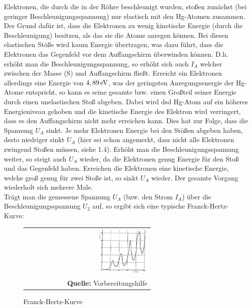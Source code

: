 \documentclass[a4paper,titlepage]{scrartcl}
\numberwithin{equation}{section}
\begin{document}
Elektronen, die durch die in der Röhre beschleunigt wurden, stoßen zunächst (bei geringer Beschleunigungsspannung) nur elastisch mit den Hg-Atomen zusammen. Der Grund dafür ist, dass die Elektronen zu wenig kinetische Energie (durch die Beschleunigung) besitzen, als das sie die Atome anregen können. Bei diesen elastischen Stöße wird kaum Energie übertragen, was dazu führt, dass die Elektronen das Gegenfeld vor dem Auffangschirm überwinden können. D.h. erhöht man die Beschleunigungsspannung, so erhöht sich auch $I_A$ welcher zwischen der Masse (S) und Auffangschirm fließt. Erreicht ein Elektronen allerdings eine Energie von $\unit[4,89]{eV}$, was der geringsten Anregungsenergie der Hg-Atome entspricht, so kann es seine gesamte bzw. einen Großteil seiner Energie durch einen unelastischen Stoß abgeben. Dabei wird dsd Hg-Atom auf ein höheres Energieniveau gehoben und die kinetische Energie des Elektron wird verringert, dass es den Auffangschirm nicht mehr erreichen kann. Dies hat zur Folge, dass die Spannung $U_A$ sinkt. Je mehr Elektronen Energie bei den Stößen abgeben haben, desto niedriger sinkt $U_A$ (hier sei schon angemerkt, dass nicht alle Elektronen zwingend Stoßen müssen, siehe 1.4). Erhöht man die Beschleunigungsspannung weiter, so steigt auch $U_A$ wieder, da die Elektronen genug Energie für den Stoß und das Gegenfeld haben. Erreichen die Elektronen eine kinetische Energie, welche groß genug für zwei Stoße ist, so sinkt $U_A$ wieder. Der gesamte Vorgang wiederholt sich mehrere Male.\\
Trägt man die gemessene Spannung $U_A$ (bzw. den Strom $I_A$) über die Beschleunigungsspannung $U_2$ auf, so ergibt sich eine typische Franck-Hertz-Kurve:

\begin{figure}[H]
	\centering
	\begin{tabular}{@{}r@{}}
		\includegraphics[width=0.4\textwidth]{bilder/franck_hertz_kurve.jpg}\\
		\footnotesize\sffamily\textbf{Quelle:} Vorbereitungshilfe \cite{vorbereitungshilfe}
	\end{tabular}
    \label{fig:aufgabe11}
	\caption{Franck-Hertz-Kurve}
\end{figure}
\end{document}
